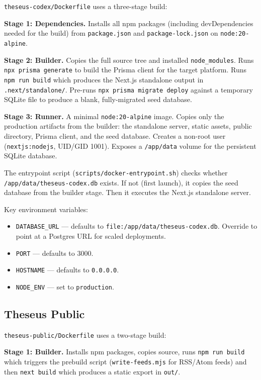 \documentclass[11pt,letterpaper]{article}
\newcommand{\file}[1]{\texttt{#1}}
\newcommand{\cmd}[1]{\texttt{#1}}
\begin{document}
\file{theseus-codex/Dockerfile} uses a three-stage build:

\textbf{Stage 1: Dependencies.} Installs all npm packages (including devDependencies needed for the build) from \file{package.json} and \file{package-lock.json} on \cmd{node:20-alpine}.

\textbf{Stage 2: Builder.} Copies the full source tree and installed \file{node\_modules}. Runs \cmd{npx prisma generate} to build the Prisma client for the target platform. Runs \cmd{npm run build} which produces the Next.js standalone output in \file{.next/standalone/}. Pre-runs \cmd{npx prisma migrate deploy} against a temporary SQLite file to produce a blank, fully-migrated seed database.

\textbf{Stage 3: Runner.} A minimal \cmd{node:20-alpine} image. Copies only the production artifacts from the builder: the standalone server, static assets, public directory, Prisma client, and the seed database. Creates a non-root user (\cmd{nextjs:nodejs}, UID/GID 1001). Exposes a \file{/app/data} volume for the persistent SQLite database.

The entrypoint script (\file{scripts/docker-entrypoint.sh}) checks whether \file{/app/data/theseus-codex.db} exists. If not (first launch), it copies the seed database from the builder stage. Then it executes the Next.js standalone server.

Key environment variables:
\begin{itemize}[leftmargin=1.5em,itemsep=0.1em]
  \item \cmd{DATABASE\_URL} --- defaults to \cmd{file:/app/data/theseus-codex.db}. Override to point at a Postgres URL for scaled deployments.
  \item \cmd{PORT} --- defaults to 3000.
  \item \cmd{HOSTNAME} --- defaults to \cmd{0.0.0.0}.
  \item \cmd{NODE\_ENV} --- set to \cmd{production}.
\end{itemize}

\subsection{Theseus Public}

\file{theseus-public/Dockerfile} uses a two-stage build:

\textbf{Stage 1: Builder.} Installs npm packages, copies source, runs \cmd{npm run build} which triggers the prebuild script (\cmd{write-feeds.mjs} for RSS/Atom feeds) and then \cmd{next build} which produces a static export in \file{out/}.
\end{document}
